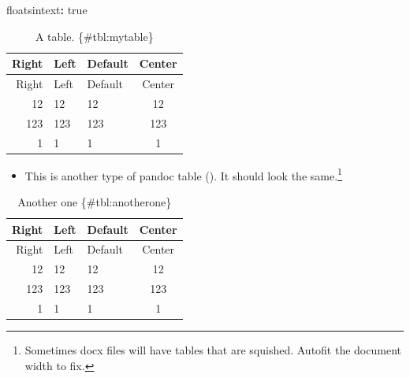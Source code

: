 \documentclass[\pandocDocMode,longtable,noextraspace,floatsintext]{apa6}
\let\tightlist\relax %
\newenvironment{Shaded}{}{}
\newcommand{\AttributeTok}[1]{\textcolor[rgb]{0.49,0.56,0.16}{#1}}
\newcommand{\CharTok}[1]{\textcolor[rgb]{0.25,0.44,0.63}{#1}}
\newcommand{\FunctionTok}[1]{\textcolor[rgb]{0.02,0.16,0.49}{#1}}
\newcommand{\KeywordTok}[1]{\textcolor[rgb]{0.00,0.44,0.13}{\textbf{#1}}}
\begin{document}
\begin{Shaded}
\begin{Highlighting}[]
\FunctionTok{floatsintext}\KeywordTok{:}\AttributeTok{ }\CharTok{true}
\end{Highlighting}
\end{Shaded}

\begin{longtable}[]{@{}rllc@{}}
\caption{A table. \{\#tbl:mytable\}}\tabularnewline
\toprule()
Right & Left & Default & Center \\
\midrule()
\endfirsthead
\toprule()
Right & Left & Default & Center \\
\midrule()
\endhead
12 & 12 & 12 & 12 \\
123 & 123 & 123 & 123 \\
1 & 1 & 1 & 1 \\
\bottomrule()
\end{longtable}

\begin{itemize}
\tightlist
\item
  This is another type of pandoc table (\textcite{tbl:anotherone}). It
  should look the same.\footnote{Sometimes docx files will have tables
    that are squished. Autofit the document width to fix.}
\end{itemize}

\begin{longtable}[]{@{}rllc@{}}
\caption{Another one \{\#tbl:anotherone\}}\tabularnewline
\toprule()
Right & Left & Default & Center \\
\midrule()
\endfirsthead
\toprule()
Right & Left & Default & Center \\
\midrule()
\endhead
12 & 12 & 12 & 12 \\
123 & 123 & 123 & 123 \\
1 & 1 & 1 & 1 \\
\bottomrule()
\end{longtable}

\newpage
\end{document}
